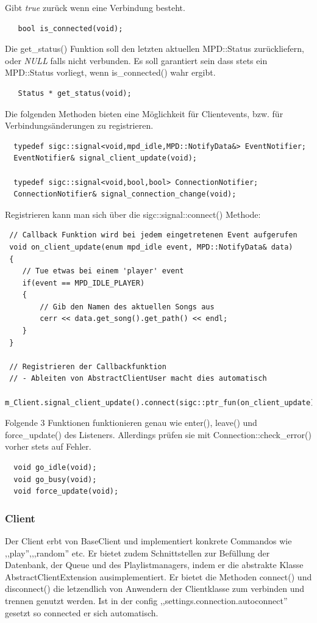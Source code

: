 Gibt \textit{true} zurück wenn eine Verbindung besteht.
\begin{verbatim}
   bool is_connected(void);
\end{verbatim}

Die get\_status() Funktion soll den letzten aktuellen MPD::Status zurückliefern,
oder \emph{NULL} falls nicht verbunden. Es soll garantiert sein dass stets ein MPD::Status vorliegt,
wenn is\_connected() wahr ergibt.
\begin{verbatim}        
   Status * get_status(void);
\end{verbatim}

Die folgenden Methoden bieten eine Möglichkeit für Clientevents, bzw. für Verbindungsänderungen zu registrieren.
\begin{verbatim}
  typedef sigc::signal<void,mpd_idle,MPD::NotifyData&> EventNotifier;
  EventNotifier& signal_client_update(void);
        
  typedef sigc::signal<void,bool,bool> ConnectionNotifier;
  ConnectionNotifier& signal_connection_change(void);
\end{verbatim}

Registrieren kann man sich über die sigc::signal::connect() Methode:
\begin{verbatim}
 // Callback Funktion wird bei jedem eingetretenen Event aufgerufen
 void on_client_update(enum mpd_idle event, MPD::NotifyData& data)
 {
    // Tue etwas bei einem 'player' event
    if(event == MPD_IDLE_PLAYER)
    {
        // Gib den Namen des aktuellen Songs aus
        cerr << data.get_song().get_path() << endl;
    }
 }

 // Registrieren der Callbackfunktion
 // - Ableiten von AbstractClientUser macht dies automatisch
 m_Client.signal_client_update().connect(sigc::ptr_fun(on_client_update));
\end{verbatim}

Folgende 3 Funktionen funktionieren genau wie enter(), leave() und force\_update() des Listeners.
Allerdings prüfen sie mit Connection::check\_error() vorher stets auf Fehler.
\begin{verbatim}
  void go_idle(void);
  void go_busy(void);
  void force_update(void);
\end{verbatim}

\subsubsection{Client}
Der Client erbt von BaseClient und implementiert konkrete Commandos wie ,,play'',,,random'' etc.
Er bietet zudem Schnittstellen zur Befüllung der Datenbank, der Queue und des Playlistmanagers, indem 
er die abstrakte Klasse AbstractClientExtension ausimplementiert.
Er bietet die Methoden connect() und disconnect() die letzendlich von Anwendern der Clientklasse zum verbinden und trennen genutzt werden. 
Ist in der config ,,settings.connection.autoconnect'' gesetzt so connected er sich automatisch.

